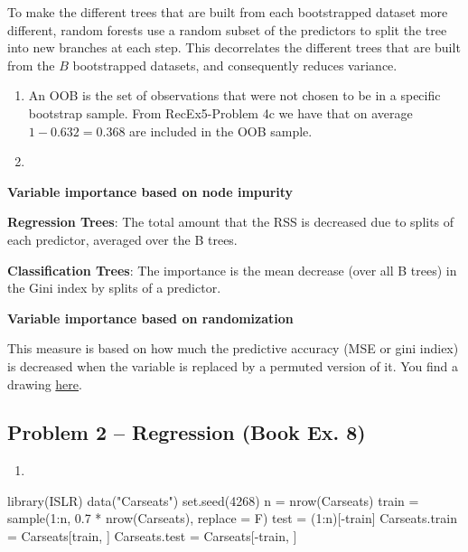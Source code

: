 \documentclass[
]{article}
\newenvironment{Shaded}{\begin{snugshade}}{\end{snugshade}}
\newcommand{\AttributeTok}[1]{\textcolor[rgb]{0.77,0.63,0.00}{#1}}
\newcommand{\DecValTok}[1]{\textcolor[rgb]{0.00,0.00,0.81}{#1}}
\newcommand{\FloatTok}[1]{\textcolor[rgb]{0.00,0.00,0.81}{#1}}
\newcommand{\FunctionTok}[1]{\textcolor[rgb]{0.00,0.00,0.00}{#1}}
\newcommand{\NormalTok}[1]{#1}
\newcommand{\OtherTok}[1]{\textcolor[rgb]{0.56,0.35,0.01}{#1}}
\newcommand{\SpecialCharTok}[1]{\textcolor[rgb]{0.00,0.00,0.00}{#1}}
\newcommand{\StringTok}[1]{\textcolor[rgb]{0.31,0.60,0.02}{#1}}
\providecommand{\tightlist}{%
  \setlength{\itemsep}{0pt}\setlength{\parskip}{0pt}}
\begin{document}
To make the different trees that are built from each bootstrapped
dataset more different, random forests use a random subset of the
predictors to split the tree into new branches at each step. This
decorrelates the different trees that are built from the \(B\)
bootstrapped datasets, and consequently reduces variance.

\begin{enumerate}
\def\labelenumi{\alph{enumi})}
\setcounter{enumi}{3}
\item
  An OOB is the set of observations that were not chosen to be in a
  specific bootstrap sample. From RecEx5-Problem 4c we have that on
  average \(1-0.632 = 0.368\) are included in the OOB sample.
\item
\end{enumerate}

\textbf{Variable importance based on node impurity}

\textbf{Regression Trees}: The total amount that the RSS is decreased
due to splits of each predictor, averaged over the B trees.

\textbf{Classification Trees}: The importance is the mean decrease (over
all B trees) in the Gini index by splits of a predictor.

\textbf{Variable importance based on randomization}

This measure is based on how much the predictive accuracy (MSE or gini
indiex) is decreased when the variable is replaced by a permuted version
of it. You find a drawing
\href{https://github.com/stefaniemuff/statlearning/blob/master/8Trees/M8_variableImportanceRandomization.pdf}{here}.

\hypertarget{problem-2-regression-book-ex.-8}{%
\subsection{Problem 2 -- Regression (Book Ex.
8)}\label{problem-2-regression-book-ex.-8}}

\begin{enumerate}
\def\labelenumi{\alph{enumi})}
\tightlist
\item
\end{enumerate}

\begin{Shaded}
\begin{Highlighting}[]
\FunctionTok{library}\NormalTok{(ISLR)}
\FunctionTok{data}\NormalTok{(}\StringTok{"Carseats"}\NormalTok{)}
\FunctionTok{set.seed}\NormalTok{(}\DecValTok{4268}\NormalTok{)}
\NormalTok{n }\OtherTok{=} \FunctionTok{nrow}\NormalTok{(Carseats)}
\NormalTok{train }\OtherTok{=} \FunctionTok{sample}\NormalTok{(}\DecValTok{1}\SpecialCharTok{:}\NormalTok{n, }\FloatTok{0.7} \SpecialCharTok{*} \FunctionTok{nrow}\NormalTok{(Carseats), }\AttributeTok{replace =}\NormalTok{ F)}
\NormalTok{test }\OtherTok{=}\NormalTok{ (}\DecValTok{1}\SpecialCharTok{:}\NormalTok{n)[}\SpecialCharTok{{-}}\NormalTok{train]}
\NormalTok{Carseats.train }\OtherTok{=}\NormalTok{ Carseats[train, ]}
\NormalTok{Carseats.test }\OtherTok{=}\NormalTok{ Carseats[}\SpecialCharTok{{-}}\NormalTok{train, ]}
\end{Highlighting}
\end{Shaded}
\end{document}
